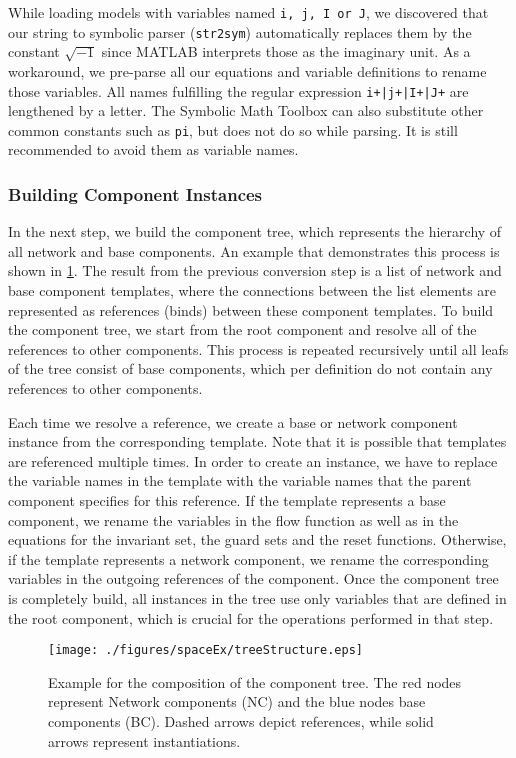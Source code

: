 While loading models with variables named \texttt{i, j, I or J}, we discovered that our string to symbolic parser (\texttt{str2sym}) automatically replaces them by the constant $\sqrt{-1}$ since MATLAB interprets those as the imaginary unit. As a workaround, we pre-parse all our equations and variable definitions to rename those variables. All names fulfilling the regular expression \texttt{i+|j+|I+|J+} are lengthened by a letter. The Symbolic Math Toolbox can also substitute other common constants such as \texttt{pi}, but does not do so while parsing. It is still recommended to avoid them as variable names.

\subsubsection{Building Component Instances} \label{sec:buildingComponentInstances}

In the next step, we build the component tree, which represents the hierarchy of all network and base components. An example that demonstrates this process is shown in \cref{fig:SpaceExTreeStructure}. The result from the previous conversion step is a list of network and base component templates, where the connections between the list elements are represented as references (binds) between these component templates. To build the component tree, we start from the root component and resolve all of the references to other components. This process is repeated recursively until all leafs of the tree consist of base components, which per definition do not contain any references to other components.

Each time we resolve a reference, we create a base or network component instance from the corresponding template. Note that it is possible that templates are referenced multiple times. In order to create an instance, we have to replace the variable names in the template with the variable names that the parent component specifies for this reference. If the template represents a base component, we rename the variables in the flow function as well as in the equations for the invariant set, the guard sets and the reset functions. Otherwise, if the template represents a network component, we rename the corresponding variables in the outgoing references of the component. Once the component tree is completely build, all instances in the tree use only variables that are defined in the root component, which is crucial for the operations performed in that step.   

\begin{figure}[htb]
  \centering									 
    \texttt{[image: ./figures/spaceEx/treeStructure.eps]}
    \caption{Example for the composition of the component tree. The red nodes represent Network components (NC) and the blue nodes base components (BC). Dashed arrows depict references, while solid arrows represent instantiations.}
    \label{fig:SpaceExTreeStructure}		
\end{figure}


